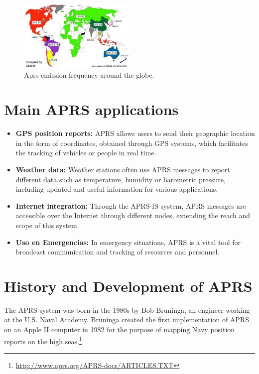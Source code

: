 \begin{figure}
	\centering
	\includegraphics[width=0.5\textwidth]{Imagenes/Chapter_1/mapa_frecuencias_aprs.jpg}
	\caption{Aprs emission frequency around the globe.}
	\label{fig:freq-map}
\end{figure}


\section{Main APRS applications}

\begin{itemize}
	\item \textbf{GPS position reports:} APRS allows users to send their geographic location in the form of coordinates, obtained through GPS systems, which facilitates the tracking of vehicles or people in real time.

	\item \textbf{Weather data:} Weather stations often use APRS messages to report different data such as temperature, humidity or barometric pressure, including updated and useful information for various applications.

	\item \textbf{Internet integration:} Through the APRS-IS system, APRS messages are accessible over the Internet through different nodes, extending the reach and scope of this system.

	\item \textbf{Uso en Emergencias:} In emergency situations, APRS is a vital tool for broadcast communication and tracking of resources and personnel.
\end{itemize}

\section{History and Development of APRS}

The APRS system was born in the 1980s by Bob Bruninga, an engineer working at the U.S. Naval Academy. Bruninga created the first implementation of APRS on an Apple II computer in 1982 for the purpose of mapping Navy position reports on the high seas.\footnote{\url{http://www.aprs.org/APRS-docs/ARTICLES.TXT}} %

